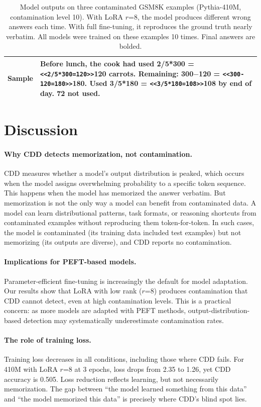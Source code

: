 \documentclass[11pt]{article}
\begin{document}
\begin{table}[t]
\begin{tabular}{p{1.8cm}p{13.5cm}}
\textbf{Sample} & Before lunch, the cook had used 2/5*300 = \texttt{<<2/5*300=120>>}120 carrots. Remaining: 300$-$120 = \texttt{<<300-120=180>>}180. Used 3/5*180 = \texttt{<<3/5*180=108>>}108 by end of day. \textbf{72} not used. \\
\bottomrule
\end{tabular}
\caption{Model outputs on three contaminated GSM8K examples (Pythia-410M, contamination level 10). With LoRA $r$=8, the model produces different wrong answers each time. With full fine-tuning, it reproduces the ground truth nearly verbatim. All models were trained on these examples 10 times. Final answers are bolded.}
\label{tab:qualitative}
\end{table}

\section{Discussion}

\paragraph{Why CDD detects memorization, not contamination.} CDD measures whether a model's output distribution is peaked, which occurs when the model assigns overwhelming probability to a specific token sequence. This happens when the model has memorized the answer verbatim. But memorization is not the only way a model can benefit from contaminated data. A model can learn distributional patterns, task formats, or reasoning shortcuts from contaminated examples without reproducing them token-for-token. In such cases, the model is contaminated (its training data included test examples) but not memorizing (its outputs are diverse), and CDD reports no contamination.

\paragraph{Implications for PEFT-based models.} Parameter-efficient fine-tuning is increasingly the default for model adaptation. Our results show that LoRA with low rank ($r$=8) produces contamination that CDD cannot detect, even at high contamination levels. This is a practical concern: as more models are adapted with PEFT methods, output-distribution-based detection may systematically underestimate contamination rates.

\paragraph{The role of training loss.} Training loss decreases in all conditions, including those where CDD fails. For 410M with LoRA $r$=8 at 3 epochs, loss drops from 2.35 to 1.26, yet CDD accuracy is 0.505. Loss reduction reflects learning, but not necessarily memorization. The gap between ``the model learned something from this data'' and ``the model memorized this data'' is precisely where CDD's blind spot lies.
\end{document}
